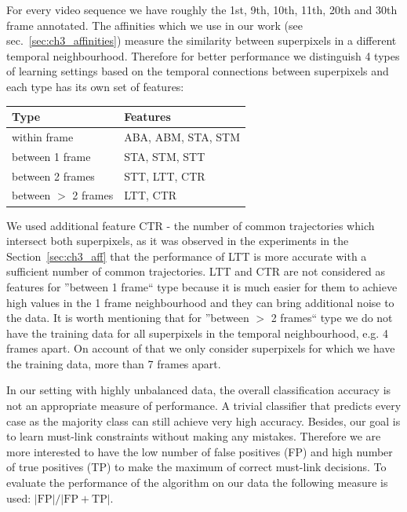 For every video sequence we have roughly the 1st, 9th, 10th, 11th, 20th and 30th frame annotated. The affinities which we use in our work (see sec.~\ref{sec:ch3_affinities}) measure the similarity between superpixels in a different
temporal neighbourhood. Therefore for better performance we distinguish 4 types of learning settings based on the temporal connections between superpixels %
and each type has its own set of features:
\renewcommand{\arraystretch}{1.3}
\begin{center}
\begin{tabular}{|l|l|}
\hline
\textbf{Type}&\textbf{Features}\\\hline
within frame& ABA, ABM, STA, STM\\\hline
between 1 frame& STA, STM, STT\\\hline
between 2 frames& STT, LTT, CTR\\\hline
between $\mathrm{>}$ 2 frames& LTT, CTR\\\hline
\end{tabular} 
\end{center}
We used additional feature CTR - the number of common trajectories which intersect both superpixels, as it was observed in the experiments in the Section~\ref{sec:ch3_aff} that the performance of LTT is more accurate with a sufficient 
number of common trajectories. LTT and CTR are not considered as features for ''between 1 frame`` type because it is much easier for them to achieve high values in the 1 frame neighbourhood and they can bring additional noise 
to the data. It is worth mentioning that for ''between $\mathrm{>}$ 2 frames`` type we do not have the training data for all superpixels in the temporal neighbourhood, e.g. 4 frames apart. On account of that we 
only consider superpixels for which we have the training data, more than 7 frames apart.

In our setting with highly unbalanced data, the overall classification accuracy is not an appropriate measure of performance. A trivial classifier that predicts every case as the majority class can still achieve very high
accuracy. Besides, our goal is to learn must-link constraints without making any mistakes. Therefore we are more interested to have the low number of false positives (FP) and high number of true positives (TP) to make the maximum
of correct must-link decisions.
To evaluate the performance of the algorithm on our data the following measure is used: $\mathrm{|FP|/|FP+TP|}$.


